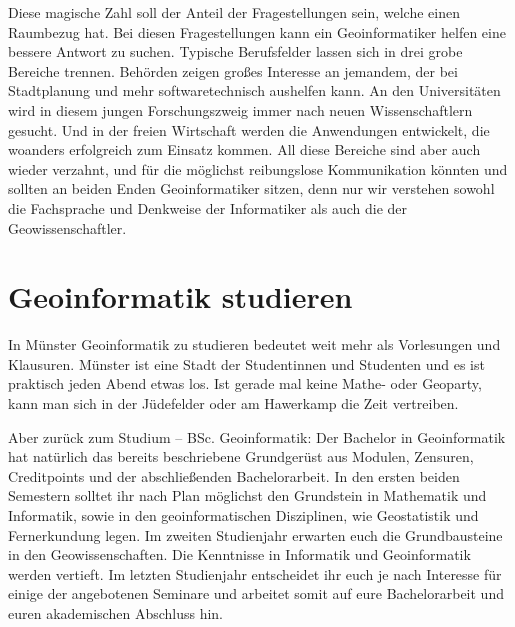 Diese magische Zahl soll der Anteil der Fragestellungen sein, welche einen Raumbezug hat. Bei diesen Fragestellungen kann ein Geoinformatiker helfen eine bessere Antwort zu suchen. Typische Berufsfelder lassen sich in drei grobe Bereiche trennen. Behörden zeigen großes Interesse an jemandem, der bei Stadtplanung und mehr softwaretechnisch aushelfen kann. An den Universitäten wird in diesem jungen Forschungszweig immer nach neuen Wissenschaftlern gesucht. Und in der freien Wirtschaft werden die Anwendungen entwickelt, die woanders erfolgreich zum Einsatz kommen. All diese Bereiche sind aber auch wieder verzahnt, und für die möglichst reibungslose Kommunikation könnten und sollten an beiden Enden Geoinformatiker sitzen, denn nur wir verstehen sowohl die Fachsprache und Denkweise der Informatiker als auch die der Geowissenschaftler.

\section*{Geoinformatik studieren}
In Münster Geoinformatik zu studieren bedeutet weit mehr als Vorlesungen und Klausuren. Münster ist eine Stadt der Studentinnen und Studenten und es ist praktisch jeden Abend etwas los. Ist gerade mal keine Mathe- oder Geoparty, kann man sich in der Jüdefelder oder am Hawerkamp die Zeit vertreiben.

Aber zurück zum Studium – BSc. Geoinformatik: Der Bachelor in Geoinformatik hat natürlich das bereits beschriebene Grundgerüst aus Modulen, Zensuren, Creditpoints und der abschließenden Bachelorarbeit. In den ersten beiden Semestern solltet ihr nach Plan möglichst den Grundstein in Mathematik und Informatik, sowie in den geoinformatischen Disziplinen, wie Geostatistik und Fernerkundung legen. Im zweiten Studienjahr erwarten euch die Grundbausteine in den Geowissenschaften. Die Kenntnisse in Informatik und Geoinformatik werden vertieft. Im letzten Studienjahr entscheidet ihr euch je nach Interesse für einige der angebotenen Seminare und arbeitet somit auf eure Bachelorarbeit und euren akademischen Abschluss hin.


